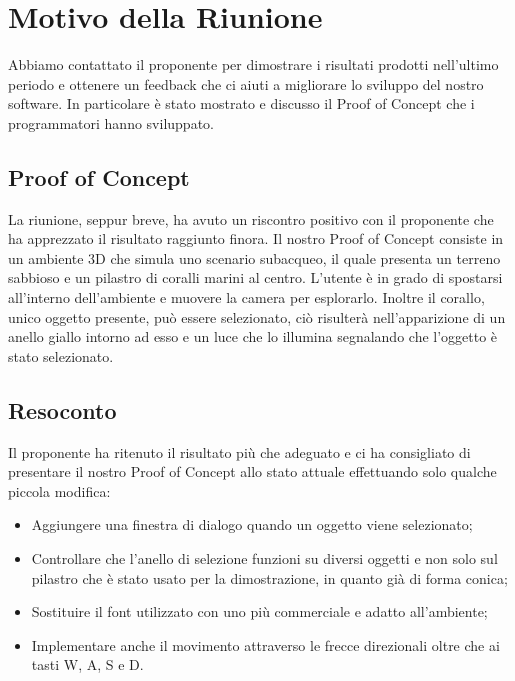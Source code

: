\section{Motivo della Riunione}
Abbiamo contattato il proponente per dimostrare i risultati prodotti nell'ultimo periodo e ottenere un feedback che ci aiuti a migliorare lo sviluppo del nostro software. \newline
In particolare è stato mostrato e discusso il Proof of Concept che i programmatori hanno sviluppato.

\subsection{Proof of Concept}
La riunione, seppur breve, ha avuto un riscontro positivo con il proponente che ha apprezzato il risultato raggiunto finora. \newline
Il nostro Proof of Concept consiste in un ambiente 3D che simula uno scenario subacqueo, il quale presenta un terreno sabbioso e un pilastro di coralli marini al centro. \newline
L'utente è in grado di spostarsi all'interno dell'ambiente e muovere la camera per esplorarlo. \newline
Inoltre il corallo, unico oggetto presente, può essere selezionato, ciò risulterà nell'apparizione di un anello giallo intorno ad esso e un luce che lo illumina segnalando che l'oggetto è stato selezionato.

\subsection{Resoconto}
Il proponente ha ritenuto il risultato più che adeguato e ci ha consigliato di presentare il nostro Proof of Concept allo stato attuale effettuando solo qualche piccola modifica: \begin{itemize}
	\item Aggiungere una finestra di dialogo quando un oggetto viene selezionato;
	\item Controllare che l'anello di selezione funzioni su diversi oggetti e non solo sul pilastro che è stato usato per la dimostrazione, in quanto già di forma conica;
	\item Sostituire il font utilizzato con uno più commerciale e adatto all'ambiente;
	\item Implementare anche il movimento attraverso le frecce direzionali oltre che ai tasti W, A, S e D. 
\end{itemize}

